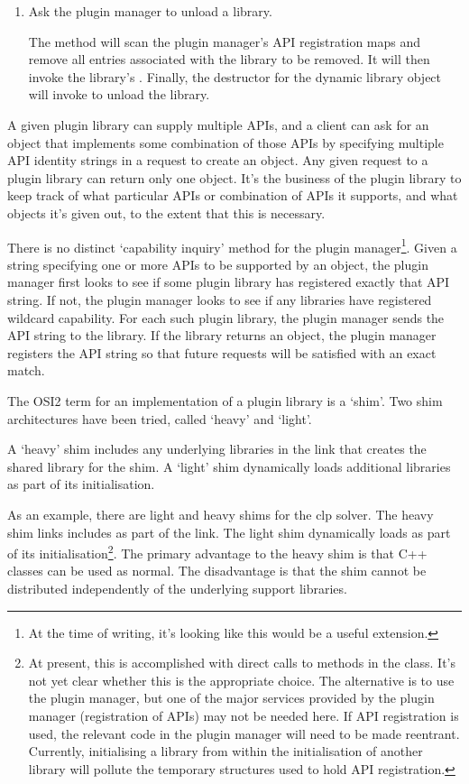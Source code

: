 \documentclass{article}
\newcommand{\OsiTwo}{OSI2\xspace}
\begin{document}
\begin{enumerate}
  \item
  Ask the plugin manager to unload a library.

  The  method will scan the plugin manager's API
  registration maps and remove all entries associated with the library to be
  removed.
  It will then invoke the library's .
  Finally, the destructor for the dynamic library object will invoke
   to unload the library.
\end{enumerate}

A given plugin library can supply multiple APIs, and a client can ask for an
object that implements some combination of those APIs by specifying multiple
API identity strings in a request to create an object.
Any given request to a plugin library can return only one object.
It's the business of the plugin library to keep track of what particular APIs
or combination of APIs it supports, and what objects it's given out, to the
extent that this is necessary.

There is no distinct `capability inquiry' method for the plugin
manager\footnote{%
    At the time of writing, it's looking like this would be a useful
    extension.}.
Given a string specifying one or more APIs to be supported by an object, the
plugin manager first looks to see if some plugin library has registered
exactly that API string.
If not, the plugin manager looks to see if any libraries have registered
wildcard capability.
For each such plugin library, the plugin manager sends the API string to the
library.
If the library returns an object, the plugin manager registers the API string
so that future requests will be satisfied with an exact match.


The \OsiTwo term for an implementation of a plugin library is a `shim'.
Two shim architectures have been tried, called `heavy' and `light'.

A `heavy' shim includes any underlying libraries in the link that creates the
shared library for the shim.
A `light' shim dynamically loads additional libraries as part of its
initialisation.

As an example, there are light and heavy shims for the clp solver.
The heavy shim links includes  as part of the link.
The light shim dynamically loads  as part of its
initialisation\footnote{%
    At present, this is accomplished with direct calls to methods in the
     class.
    It's not yet clear whether this is the appropriate choice.
    The alternative is to use the plugin manager, but one of the major
    services provided by
    the plugin manager (registration of APIs) may not be needed here.
    If API registration is used, the relevant code in the plugin manager
    will need to be made reentrant.
    Currently, initialising a library from within the initialisation of
    another library will pollute the temporary structures used to hold API
    registration.}.
The primary advantage to the heavy shim is that C++ classes can be used as
normal.
The disadvantage is that the shim cannot be distributed independently of the
underlying support libraries.
\end{document}

